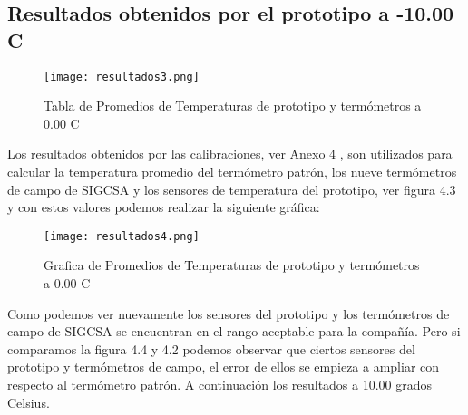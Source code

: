 \subsection{Resultados obtenidos por el prototipo a -10.00 C}

\begin{figure}[H]
	\centering
	\texttt{[image: resultados3.png]}
	\caption{Tabla de Promedios de Temperaturas de prototipo y termómetros a 0.00 C}
\end{figure}

\par \noindent 
Los resultados obtenidos por las calibraciones, ver Anexo 4 , son utilizados para calcular la temperatura promedio del termómetro patrón, los nueve termómetros de campo de SIGCSA y los sensores de temperatura del prototipo, ver figura 4.3 y con estos valores podemos realizar la siguiente gráfica:

\begin{figure}[H]
	\centering
	\texttt{[image: resultados4.png]}
	\caption{Grafica de Promedios de Temperaturas de prototipo y termómetros a 0.00 C}
\end{figure}

\par \noindent
Como podemos ver nuevamente los sensores del prototipo y los termómetros de campo de SIGCSA se encuentran en el rango aceptable para la compañía. Pero si comparamos la figura 4.4 y 4.2 podemos observar que ciertos sensores del prototipo y termómetros de campo, el error de ellos se empieza a ampliar con respecto al termómetro patrón. A continuación los resultados a 10.00 grados Celsius.
